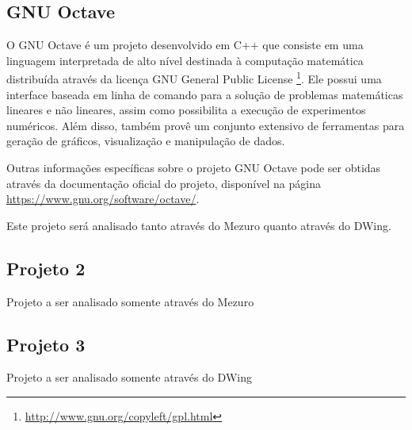 \subsection{GNU Octave}
\label{section-octave}

O GNU Octave é um projeto desenvolvido em C++ que consiste em uma linguagem interpretada de alto nível destinada à computação matemática distribuída através da licença GNU General Public License \footnote{\url{http://www.gnu.org/copyleft/gpl.html}}. Ele possui uma interface baseada em linha de comando para a solução de problemas matemáticas lineares e não lineares, assim como possibilita a execução de experimentos numéricos. Além disso, também provê um conjunto extensivo de ferramentas para geração de gráficos, visualização e manipulação de dados.

Outras informações específicas sobre o projeto GNU Octave pode ser obtidas através da documentação oficial do projeto, disponível na página \url{https://www.gnu.org/software/octave/}.

Este projeto será analisado tanto através do Mezuro quanto através do DWing.


\subsection{Projeto 2}
\label{}

Projeto a ser analisado somente através do Mezuro

\subsection{Projeto 3}
\label{}

Projeto a ser analisado somente através do DWing

